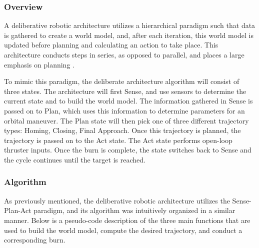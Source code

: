 \documentclass[journal, 10pt]{IEEEtran}
\begin{document}
\subsubsection{Overview}
A deliberative robotic architecture utilizes a hierarchical paradigm such that data is gathered to create a world model, and, after each iteration, this world model is updated before planning and calculating an action to take place. This architecture conducts steps in series, as opposed to parallel, and places a large emphasis on planning \cite{joshi}.

To mimic this paradigm, the deliberate architecture algorithm will consist of three states. The architecture will first Sense, and use sensors to determine the current state and to build the world model. The information gathered in Sense is passed on to Plan, which uses this information to determine parameters for an orbital maneuver. The Plan state will then pick one of three different trajectory types: Homing, Closing, Final Approach. Once this trajectory is planned, the trajectory is passed on to the Act state. The Act state performs open-loop thruster inputs. Once the burn is complete, the state switches back to Sense and the cycle continues until the target is reached.

\subsubsection{Algorithm}
As previously mentioned, the deliberative robotic architecture utilizes the Sense-Plan-Act paradigm, and its algorithm was intuitively organized in a similar manner. Below is a pseudo-code description of the three main functions that are used to build the world model, compute the desired trajectory, and conduct a corresponding burn. 
\end{document}
